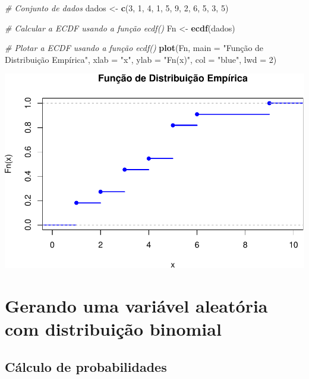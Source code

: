 \documentclass[
]{book}
\newenvironment{Shaded}{\begin{snugshade}}{\end{snugshade}}
\newcommand{\AttributeTok}[1]{\textcolor[rgb]{0.13,0.29,0.53}{#1}}
\newcommand{\CommentTok}[1]{\textcolor[rgb]{0.56,0.35,0.01}{\textit{#1}}}
\newcommand{\DecValTok}[1]{\textcolor[rgb]{0.00,0.00,0.81}{#1}}
\newcommand{\FunctionTok}[1]{\textcolor[rgb]{0.13,0.29,0.53}{\textbf{#1}}}
\newcommand{\NormalTok}[1]{#1}
\newcommand{\OtherTok}[1]{\textcolor[rgb]{0.56,0.35,0.01}{#1}}
\newcommand{\StringTok}[1]{\textcolor[rgb]{0.31,0.60,0.02}{#1}}
\begin{document}
\begin{Shaded}
\begin{Highlighting}[]
\CommentTok{\# Conjunto de dados}
\NormalTok{dados }\OtherTok{\textless{}{-}} \FunctionTok{c}\NormalTok{(}\DecValTok{3}\NormalTok{, }\DecValTok{1}\NormalTok{, }\DecValTok{4}\NormalTok{, }\DecValTok{1}\NormalTok{, }\DecValTok{5}\NormalTok{, }\DecValTok{9}\NormalTok{, }\DecValTok{2}\NormalTok{, }\DecValTok{6}\NormalTok{, }\DecValTok{5}\NormalTok{, }\DecValTok{3}\NormalTok{, }\DecValTok{5}\NormalTok{)}

\CommentTok{\# Calcular a ECDF usando a função ecdf()}
\NormalTok{Fn }\OtherTok{\textless{}{-}} \FunctionTok{ecdf}\NormalTok{(dados)}

\CommentTok{\# Plotar a ECDF usando a função ecdf()}
\FunctionTok{plot}\NormalTok{(Fn, }\AttributeTok{main =} \StringTok{"Função de Distribuição Empírica"}\NormalTok{, }\AttributeTok{xlab =} \StringTok{"x"}\NormalTok{, }\AttributeTok{ylab =} \StringTok{"Fn(x)"}\NormalTok{, }\AttributeTok{col =} \StringTok{"blue"}\NormalTok{, }\AttributeTok{lwd =} \DecValTok{2}\NormalTok{)}
\end{Highlighting}
\end{Shaded}

\includegraphics{meuLivro2_files/figure-latex/unnamed-chunk-122-1.pdf}

\section{Gerando uma variável aleatória com distribuição binomial}\label{gerando-uma-variuxe1vel-aleatuxf3ria-com-distribuiuxe7uxe3o-binomial}

\subsection{Cálculo de probabilidades}\label{cuxe1lculo-de-probabilidades}
\end{document}
